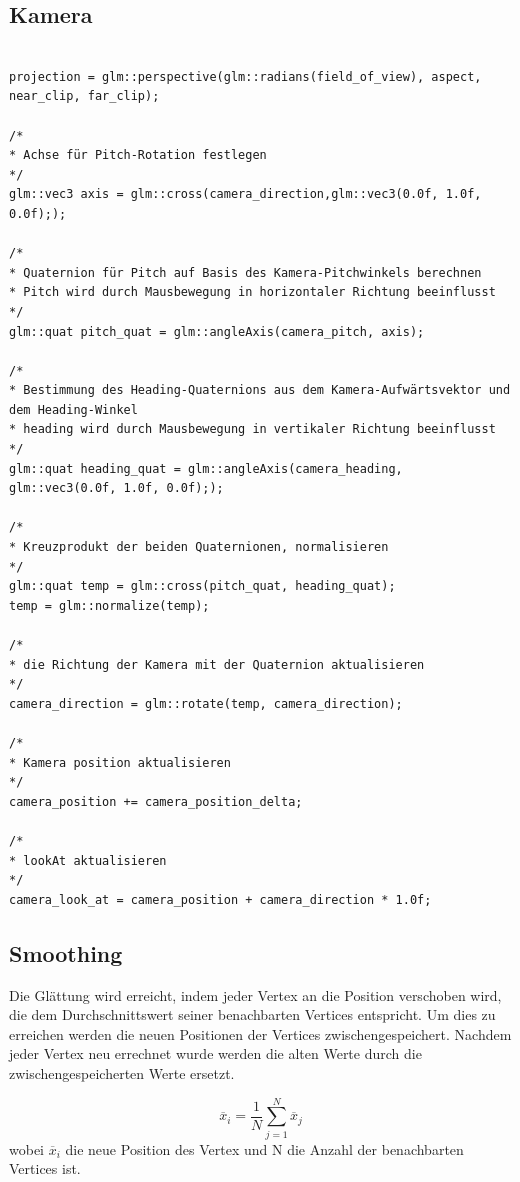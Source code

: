 \subsection{Kamera}

\begin{lstlisting}

projection = glm::perspective(glm::radians(field_of_view), aspect, near_clip, far_clip);

/*
* Achse für Pitch-Rotation festlegen
*/
glm::vec3 axis = glm::cross(camera_direction,glm::vec3(0.0f, 1.0f, 0.0f););

/*
* Quaternion für Pitch auf Basis des Kamera-Pitchwinkels berechnen
* Pitch wird durch Mausbewegung in horizontaler Richtung beeinflusst
*/
glm::quat pitch_quat = glm::angleAxis(camera_pitch, axis);

/*
* Bestimmung des Heading-Quaternions aus dem Kamera-Aufwärtsvektor und dem Heading-Winkel
* heading wird durch Mausbewegung in vertikaler Richtung beeinflusst
*/
glm::quat heading_quat = glm::angleAxis(camera_heading, glm::vec3(0.0f, 1.0f, 0.0f););

/*
* Kreuzprodukt der beiden Quaternionen, normalisieren
*/
glm::quat temp = glm::cross(pitch_quat, heading_quat);
temp = glm::normalize(temp);

/*
* die Richtung der Kamera mit der Quaternion aktualisieren
*/
camera_direction = glm::rotate(temp, camera_direction);

/*
* Kamera position aktualisieren
*/
camera_position += camera_position_delta;

/*
* lookAt aktualisieren
*/
camera_look_at = camera_position + camera_direction * 1.0f;

\end{lstlisting}

\subsection{Smoothing}

Die Glättung wird erreicht, indem jeder Vertex an die Position verschoben wird, die dem Durchschnittswert seiner benachbarten Vertices entspricht. Um dies zu erreichen werden die neuen Positionen der Vertices zwischengespeichert. Nachdem jeder Vertex neu errechnet wurde werden die alten Werte durch die zwischengespeicherten Werte ersetzt.

\[\overline{x}_i = \frac{1}{N}\sum_{j=1}^{N}\overline{x}_j\]
wobei \(\overline{x}_i\) die neue Position des Vertex und N die Anzahl der benachbarten Vertices ist.

